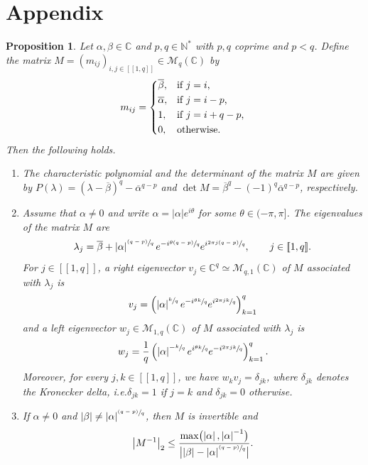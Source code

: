 \documentclass[10pt]{amsart}
\newcommand{\psfrac}[2]{\sfrac{(#1)}{#2}}
\newcommand{\llbracket}{[\![}
\newcommand{\rrbracket}{]\!]}
\theoremstyle{plain}
\newtheorem{prop}[theo]{Proposition}
\theoremstyle{definition}
\newcommand{\abs}[1]{\left\lvert #1\right \rvert}
\newcommand{\babs}[1]{\bigl\lvert #1\bigr \rvert}
\providecommand{\ie}{i.e.}\providecommand{\etc}{etc.}\providecommand{\resp}{resp.}\providecommand{\cf}{cf.}
\begin{document}
\appendix

\section*{Appendix}
\label{AppM}

\begin{prop}
\label{AppPropM}
Let $\alpha, \beta \in \mathbb C$ and $p, q \in \mathbb N^\ast$ with $p, q$ coprime and $p < q$. Define the matrix $M = (m_{ij})_{i, j \in \llbracket 1, q\rrbracket} \in \mathcal M_{q}(\mathbb C)$ by
\begin{equation}
\label{DefMij}
m_{ij} =
\begin{dcases*}
\overline\beta, & if $j = i$, \\
\overline\alpha, & if $j = i - p$, \\
1, & if $j = i + q - p$, \\
0, & otherwise.
\end{dcases*}
\end{equation}
Then the following holds.

\begin{enumerate}
\item\label{AppCharactPolyM} The characteristic polynomial and the determinant of the matrix $M$ are given by $P(\lambda) = \left(\lambda - \overline\beta\right)^q - \overline\alpha^{q - p}$ and $\det M = \overline\beta^q - (-1)^q \overline\alpha^{q - p}$, respectively.

\item\label{AppEigenvectorsM} Assume that $\alpha \neq 0$ and write $\alpha = \abs{\alpha} e^{i\theta}$ for some $\theta \in (-\pi, \pi]$. The eigenvalues of the matrix $M$ are
\begin{equation}
\label{EigenvaluesM}
\lambda_j = \overline\beta + \abs{\alpha}^{\psfrac{q - p}{q}} e^{-i\sfrac{\theta(q - p)}{q}} e^{i \sfrac{2\pi j (q - p)}{q}}, \qquad j \in \llbracket 1, q\rrbracket.
\end{equation}
For $j \in \llbracket 1, q\rrbracket$, a right eigenvector $v_j \in \mathbb C^q \simeq \mathcal M_{q, 1}(\mathbb C)$ of $M$ associated with $\lambda_j$ is
\[
v_j = \left(\abs{\alpha}^{\sfrac{k}{q}} e^{-i \sfrac{\theta k}{q}} e^{i \sfrac{2\pi j k}{q}}\right)_{k=1}^q
\]
and a left eigenvector $w_j \in \mathcal M_{1, q}(\mathbb C)$ of $M$ associated with $\lambda_j$ is
\[
w_j = \frac{1}{q} \left(\abs{\alpha}^{-\sfrac{k}{q}} e^{i \sfrac{\theta k}{q}} e^{-i \sfrac{2\pi j k}{q}}\right)_{k=1}^q.
\]
Moreover, for every $j, k \in \llbracket 1, q\rrbracket$, we have $w_k v_j = \delta_{jk}$, where $\delta_{jk}$ denotes the Kronecker delta, \ie $\delta_{jk} = 1$ if $j = k$ and $\delta_{jk} = 0$ otherwise.

\item\label{AppInverseM} If $\alpha \neq 0$ and $\abs{\beta} \neq \abs{\alpha}^{\psfrac{q - p}{q}}$, then $M$ is invertible and
\[\abs{M^{-1}}_{2} \leq \frac{\max\bigl(\abs{\alpha}, \abs{\alpha}^{-1}\bigr)}{\babs{\abs{\beta} - \abs{\alpha}^{\psfrac{q - p}{q}}}}.\]
\end{enumerate}
\end{prop}
\end{document}
